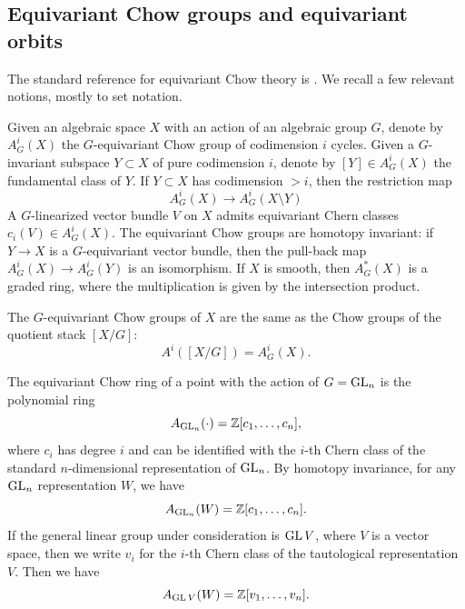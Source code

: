 \documentclass[12pt,reqno]{amsart}
\renewcommand{\to}{{\longrightarrow}}
\numberwithin{equation}{section}
\begin{document}

\subsection{Equivariant Chow groups and equivariant orbits}
The standard reference for equivariant Chow theory is \cite{edi.gra:98}.
We recall a few relevant notions, mostly to set notation.

Given an algebraic space $X$ with an action of an algebraic group $G$,
denote by $A^i_G(X)$ the $G$-equivariant Chow group of codimension $i$
cycles.  Given a $G$-invariant subspace $Y \subset X$ of pure
codimension $i$, denote by $[Y] \in A^i_G(X)$ the fundamental class of
$Y$.  If $Y \subset X$ has codimension $> i$, then the restriction map
\[ A^i_G(X) \to A^i_G(X \setminus Y)\] A $G$-linearized vector bundle
$V$ on $X$ admits equivariant Chern classes $c_i(V) \in A^i_G(X)$.
The equivariant Chow groups are homotopy invariant: if $Y \to X$ is a
$G$-equivariant vector bundle, then the pull-back map
$A^i_G(X) \to A^i_G(Y)$ is an isomorphism.  If $X$ is smooth, then
$A^*_G(X)$ is a graded ring, where the multiplication is given by the
intersection product.

The $G$-equivariant Chow groups of $X$ are the same as the Chow groups
of the quotient stack $[X/G]$:
\[ A^i\left( [X/G] \right) = A^i_G(X).\]

The equivariant Chow ring of a point with the action of $G = \operatorname{GL}_n$ is
the polynomial ring
\[ A_{\operatorname{GL}_n}(\cdot) = \mathbb Z[c_1,\dots, c_n],\] where $c_i$ has
degree $i$ and can be identified with the $i$-th Chern class of the
standard $n$-dimensional representation of $\operatorname{GL}_n$.  By homotopy
invariance, for any $\operatorname{GL}_n$ representation $W$, we have
\[ A_{\operatorname{GL}_n}(W) = \mathbb Z[c_1,\dots,c_n].\] If the general linear
group under consideration is $\operatorname{GL} V$, where $V$ is a vector space,
then we write $v_i$ for the $i$-th Chern class of the tautological
representation $V$.  Then we have
\[ A_{\operatorname{GL} V}(W) = \mathbb Z[v_1,\dots,v_n].\]
\end{document}
